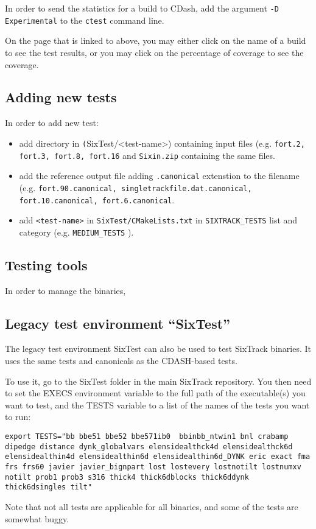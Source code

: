\documentclass[english,BCOR=0mm,DIV=18]{scrartcl}
\begin{document}
In order to send the statistics for a build to CDash, add the argument \texttt{-D Experimental} to the \texttt{ctest} command line.

On the page that is linked to above, you may either click on the name of a build to see the test results, or you may click on the percentage of coverage to see the coverage.

\subsection{Adding new tests}

In order to add new test:
\begin{itemize}
    \item add directory in \texttt(SixTest/<test-name>) containing input files
        (e.g.  \texttt{fort.2, fort.3, fort.8, fort.16} and
        \texttt{Sixin.zip} containing the same files.
    \item add the reference output file adding \texttt{.canonical} extenstion to the filename (e.g. \texttt{fort.90.canonical, singletrackfile.dat.canonical, fort.10.canonical, fort.6.canonical}.
    \item add \texttt{<test-name>} in \texttt{SixTest/CMakeLists.txt} in \texttt{SIXTRACK\_TESTS} list and category (e.g. \texttt{MEDIUM\_TESTS} ).
\end{itemize}



\subsection{Testing tools}
In order to manage the binaries, 

\subsection{Legacy test environment ``SixTest''}

The legacy test environment SixTest can also be used to test SixTrack binaries.
It uses the same tests and canonicals as the CDASH-based tests.

To use it, go to the SixTest folder in the main SixTrack repository.
You then need to set the EXECS environment variable to the full path of the executable(s) you want to test, and the TESTS variable to a list of the names of the tests you want to run:
\begin{lstlisting}
export TESTS="bb bbe51 bbe52 bbe571ib0  bbinbb_ntwin1 bnl crabamp dipedge distance dynk_globalvars elensidealthck4d elensidealthck6d elensidealthin4d elensidealthin6d elensidealthin6d_DYNK eric exact fma frs frs60 javier javier_bignpart lost lostevery lostnotilt lostnumxv notilt prob1 prob3 s316 thick4 thick6dblocks thick6ddynk thick6dsingles tilt"
\end{lstlisting}
Note that not all tests are applicable for all binaries, and some of the tests are somewhat buggy.
\end{document}

